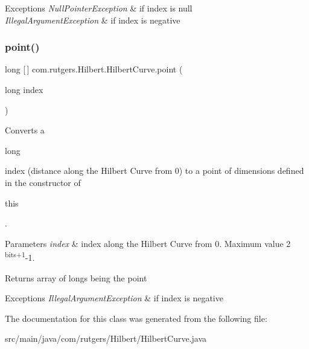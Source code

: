 \begin{DoxyExceptions}{Exceptions}
{\em Null\+Pointer\+Exception} & if index is null \\
\hline
{\em Illegal\+Argument\+Exception} & if index is negative \\
\hline
\end{DoxyExceptions}
\mbox{\label{classcom_1_1rutgers_1_1Hilbert_1_1HilbertCurve_ac7eecda9bbcd50896e9d16d04fcbc936}} 
\subsubsection{\texorpdfstring{point()}{point()}\hspace{0.1cm}{\footnotesize\ttfamily [2/2]}}
{\footnotesize\ttfamily long \mbox{[}$\,$\mbox{]} com.\+rutgers.\+Hilbert.\+Hilbert\+Curve.\+point (\begin{DoxyParamCaption}\item[{long}]{index }\end{DoxyParamCaption})}

Converts a
\begin{DoxyCode}
\textcolor{keywordtype}{long} 
\end{DoxyCode}
 index (distance along the Hilbert Curve from 0) to a point of dimensions defined in the constructor of
\begin{DoxyCode}
\textcolor{keyword}{this} 
\end{DoxyCode}
 .


\begin{DoxyParams}{Parameters}
{\em index} & index along the Hilbert Curve from 0. Maximum value 2 \textsuperscript{bits+1}-\/1. \\
\hline
\end{DoxyParams}
\begin{DoxyReturn}{Returns}
array of longs being the point 
\end{DoxyReturn}

\begin{DoxyExceptions}{Exceptions}
{\em Illegal\+Argument\+Exception} & if index is negative \\
\hline
\end{DoxyExceptions}


The documentation for this class was generated from the following file\+:\begin{DoxyCompactItemize}
\item 
src/main/java/com/rutgers/\+Hilbert/Hilbert\+Curve.\+java\end{DoxyCompactItemize}
